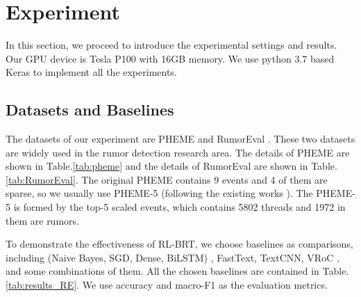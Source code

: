 \section{Experiment}
\label{sec:experiment}
In this section, we proceed to introduce the experimental settings and results. Our GPU device is Tesla P100 with 16GB memory. We use python 3.7 based Keras to implement all the experiments.

\subsection{Datasets and Baselines}
\label{sec:dataset}
The datasets of our experiment are  PHEME \cite{DBLP:conf/coling/KochkinaLZ18} and RumorEval \cite{DBLP:conf/semeval/EnayetE17}. These two datasets are widely used in the rumor detection research area. The details of PHEME are shown in Table.\ref{tab:pheme} and the details of RumorEval are shown in Table.\ref{tab:RumorEval}. The original PHEME contains 9 events and 4 of them are sparse, so we usually use PHEME-5 (following the existing works \cite{DBLP:conf/www/ChengNB20}). The PHEME-5 is formed by the top-5 scaled events, which contains 5802 threads and 1972 in them are rumors. 

To demonstrate the effectiveness of RL-BRT, we choose baselines as comparisons, including (Naive Bayes, SGD, Dense, BiLSTM) \cite{DBLP:conf/emnlp/QazvinianRRM11}, FastText\cite{DBLP:conf/eacl/GraveMJB17}, TextCNN\cite{DBLP:conf/emnlp/Kim14}, VRoC \cite{DBLP:conf/www/ChengNB20}, and some combinations of them. All the chosen baselines are contained in Table.\ref{tab:results_RE}. We use accuracy and macro-F1 as the evaluation metrics.

\begin{table}[htbp]
	\caption{PHEME}
	\centering
	\label{tab:pheme}
\end{table}

